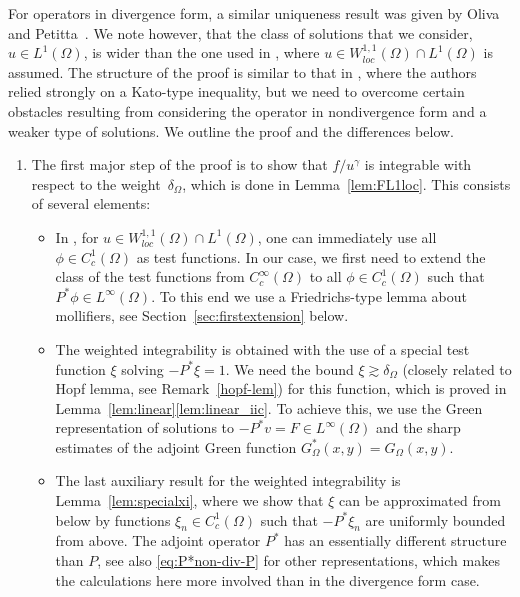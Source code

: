 \documentclass[12pt,a4paper]{amsart}
\theoremstyle{definition}
\begin{document}
\smallskip
For operators in divergence form, a similar uniqueness result was given by Oliva and Petitta~\cite{OLIVA}. We note however, that the class of solutions that we consider, $u\in L^1(\Omega)$, is wider than the one used in \cite{OLIVA}, where $u\in W^{1,1}_{loc}(\Omega)\cap L^1(\Omega)$ is assumed. The structure of the proof is similar to that in \cite{OLIVA}, where the authors relied strongly on a Kato-type inequality, but we need to overcome certain obstacles resulting from considering the operator in nondivergence form and a weaker type of solutions. We outline the proof and the differences below. 
\begin{enumerate}[label={\textup{\textbf{\arabic*)}}}]
    \item The first major step of the proof is to show that $f/u^\gamma$ is integrable with respect to the weight~$\delta_\Omega$, which is done in Lemma~\ref{lem:FL1loc}. This consists of several elements:
    \begin{itemize}[leftmargin=3.9mm]
    \item
    In \cite{OLIVA}, for $u\in W^{1,1}_{loc}(\Omega)\cap L^1(\Omega)$, one can immediately use all $\phi\in C^1_c(\Omega)$ as test functions. In our case, we first need to extend the class of the test functions from $C_c^\infty(\Omega)$ to all $\phi\in C^1_c(\Omega)$ such that $P^*\phi\in L^\infty(\Omega)$. To this end we use a Friedrichs-type lemma about mollifiers, see Section~\ref{sec:firstextension} below.
    \item The weighted integrability is obtained with the use of a special test function $\xi$ solving $-P^*\xi = 1$. We need the bound $\xi\gtrsim \delta_\Omega$ (closely related to Hopf lemma, see Remark~\ref{hopf-lem}) for this function, which is proved in Lemma~\ref{lem:linear}\ref{lem:linear_iic}.
     To achieve this, we use the Green representation of solutions to $-P^*v = F\in L^\infty(\Omega)$ and the sharp estimates of the adjoint Green function $G^*_\Omega(x,y)=G_\Omega(x,y)$.  
     \item The last auxiliary result for the weighted integrability is Lemma~\ref{lem:specialxi}, where we show that $\xi$ can be approximated from below by functions $\xi_n \in C^1_c(\Omega)$ such that $-P^*\xi_n$ are uniformly bounded from above. The adjoint operator $P^*$ has an essentially different structure than $P$, see also \eqref{eq:P*non-div-P} for other representations, which makes the calculations here more involved than in the divergence form case.
     \end{itemize}

\end{enumerate}
\end{document}
